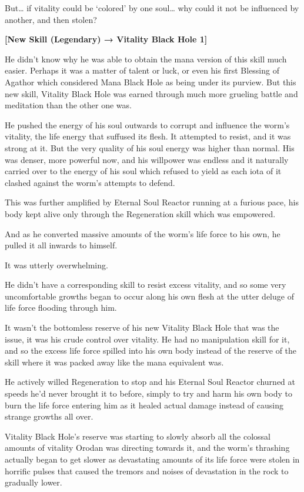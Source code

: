 \documentclass[a4paper,10pt]{book}
\begin{document}
But… if vitality could be ‘colored’ by one soul… why could it not be influenced by another, and then stolen?\par
\textbf{[New Skill (Legendary) → Vitality Black Hole 1]}\par
He didn’t know why he was able to obtain the mana version of this skill much easier. Perhaps it was a matter of talent or luck, or even his first Blessing of Agathor which considered Mana Black Hole as being under its purview. But this new skill, Vitality Black Hole was earned through much more grueling battle and meditation than the other one was.\par
He pushed the energy of his soul outwards to corrupt and influence the worm’s vitality, the life energy that suffused its flesh. It attempted to resist, and it was strong at it. But the very quality of his soul energy was higher than normal. His was denser, more powerful now, and his willpower was endless and it naturally carried over to the energy of his soul which refused to yield as each iota of it clashed against the worm’s attempts to defend.\par
This was further amplified by Eternal Soul Reactor running at a furious pace, his body kept alive only through the Regeneration skill which was empowered.\par
And as he converted massive amounts of the worm’s life force to his own, he pulled it all inwards to himself.\par
It was utterly overwhelming.\par
He didn’t have a corresponding skill to resist excess vitality, and so some very uncomfortable growths began to occur along his own flesh at the utter deluge of life force flooding through him.\par
It wasn’t the bottomless reserve of his new Vitality Black Hole that was the issue, it was his crude control over vitality. He had no manipulation skill for it, and so the excess life force spilled into his own body instead of the reserve of the skill where it was packed away like the mana equivalent was.\par
He actively willed Regeneration to stop and his Eternal Soul Reactor churned at speeds he’d never brought it to before, simply to try and harm his own body to burn the life force entering him as it healed actual damage instead of causing strange growths all over.\par
Vitality Black Hole’s reserve was starting to slowly absorb all the colossal amounts of vitality Orodan was directing towards it, and the worm’s thrashing actually began to get slower as devastating amounts of its life force were stolen in horrific pulses that caused the tremors and noises of devastation in the rock to gradually lower.\par
\end{document}
